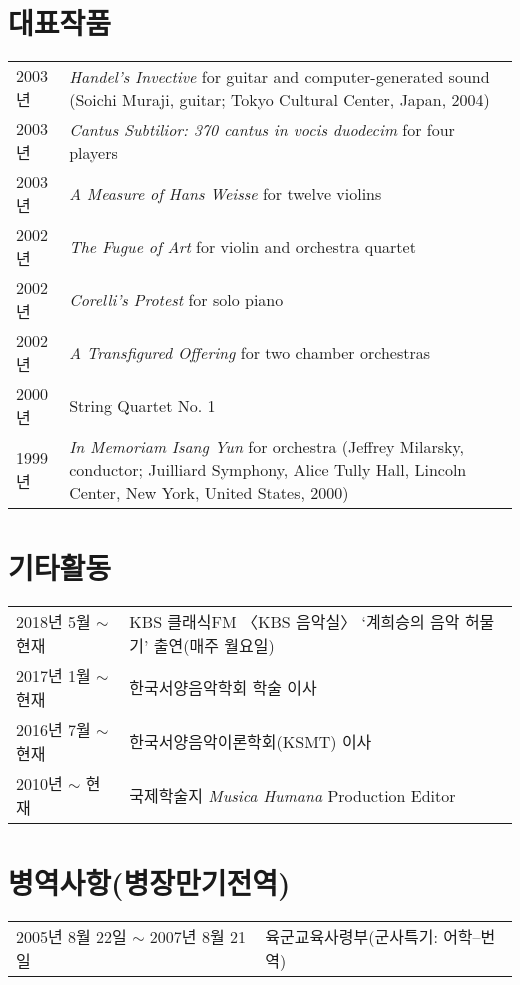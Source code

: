 \documentclass[dvipdfmx,a4paper]{article}
\begin{document}
  \section*{\normalsize 대표작품}
  
  \hspace*{-0.25cm}
  \begin{tabular}{p{1.5cm} p{12.5cm}}
    2003년 & \textit{Handel’s Invective} for guitar and computer-generated sound (Soichi Muraji, guitar; Tokyo Cultural Center, Japan, 2004)\\[0.5mm]
    
    2003년 & \textit{Cantus Subtilior: 370 cantus in vocis duodecim} for four
    players\\[0.5mm]
    
    2003년 & \textit{A Measure of Hans Weisse} for twelve violins\\[0.5mm]
    
    2002년 & \textit{The Fugue of Art} for violin and orchestra quartet\\[0.5mm]
    
    2002년 & \textit{Corelli’s Protest} for solo piano\\[0.5mm]
    
    2002년 & \textit{A Transfigured Offering} for two chamber orchestras\\[0.5mm]
    
    2000년 & String Quartet No. 1\\[0.5mm]
    
    1999년 & \textit{In Memoriam Isang Yun} for orchestra (Jeffrey Milarsky, conductor; Juilliard Symphony, Alice Tully Hall, Lincoln Center, New York, United States, 2000)
  \end{tabular}
  
  \vspace{2.5mm}
  
  \section*{\normalsize 기타활동}
  
  \hspace*{-0.25cm}
  \begin{tabular}{p{3.0cm} l}
    2018년 5월 $\sim$ 현재 & KBS 클래식FM 〈KBS 음악실〉 ‘계희승의 음악 허물기’ 출연(매주 월요일)\\[0.5mm]
    
    2017년 1월 $\sim$ 현재 & 한국서양음악학회 학술 이사\\[0.5mm]
    
    2016년 7월 $\sim$ 현재 & 한국서양음악이론학회(KSMT) 이사\\[0.5mm]
    
    2010년 $\sim$ 현재 & 국제학술지 \textit{Musica Humana} Production Editor
  \end{tabular}
      
  \vspace{2.5mm}
  
  \section*{\normalsize 병역사항(병장만기전역)}
  
  \hspace*{-0.25cm}
  \begin{tabular}{p{5.5cm} l}
    2005년 8월 22일 $\sim$ 2007년 8월 21일 & 육군교육사령부(군사특기: 어학--번역)
  \end{tabular}
\end{document}
